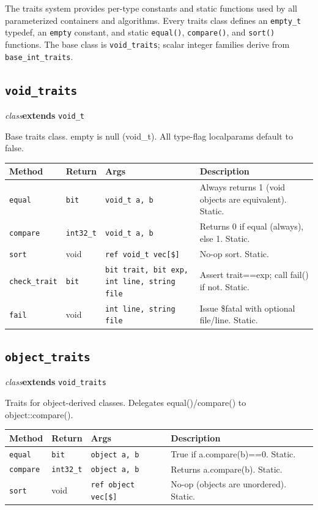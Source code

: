 \documentclass[11pt,letterpaper]{report}
\begin{document}
The traits system provides per-type constants and static functions used by all parameterized containers and algorithms. Every traits class defines an \texttt{empty\_t} typedef, an \texttt{empty} constant, and static \texttt{equal()}, \texttt{compare()}, and \texttt{sort()} functions. The base class is \texttt{void\_traits}; scalar integer families derive from \texttt{base\_int\_traits}.

\subsection*{\texttt{void\_traits}}
\noindent\small\textit{class}\quad \textbf{extends} \texttt{void\_t}\par

Base traits class. empty is null (void\_t). All type-flag localparams default to false.

\begin{xltabular}{\linewidth}{>{\small}p{1.35in} >{\small}p{1.25in} >{\small}p{0.95in} >{\small}X}
\toprule
\textbf{Method} & \textbf{Return} & \textbf{Args} & \textbf{Description} \\
\midrule
\endhead
\bottomrule
\endfoot
\texttt{equal} & \texttt{bit} & \texttt{void\_t a, b} & Always returns 1 (void objects are equivalent). Static. \\
\texttt{compare} & \texttt{int32\_t} & \texttt{void\_t a, b} & Returns 0 if equal (always), else 1. Static. \\
\texttt{sort} & void & \texttt{ref void\_t vec[\$]} & No-op sort. Static. \\
\texttt{check\_trait} & \texttt{bit} & \texttt{bit trait, bit exp, int line, string file} & Assert trait==exp; call fail() if not. Static. \\
\texttt{fail} & void & \texttt{int line, string file} & Issue \$fatal with optional file/line. Static. \\
\end{xltabular}

\subsection*{\texttt{object\_traits}}
\noindent\small\textit{class}\quad \textbf{extends} \texttt{void\_traits}\par

Traits for object-derived classes. Delegates equal()/compare() to object::compare().

\begin{xltabular}{\linewidth}{>{\small}p{1.35in} >{\small}p{1.25in} >{\small}p{0.95in} >{\small}X}
\toprule
\textbf{Method} & \textbf{Return} & \textbf{Args} & \textbf{Description} \\
\midrule
\endhead
\bottomrule
\endfoot
\texttt{equal} & \texttt{bit} & \texttt{object a, b} & True if a.compare(b)==0. Static. \\
\texttt{compare} & \texttt{int32\_t} & \texttt{object a, b} & Returns a.compare(b). Static. \\
\texttt{sort} & void & \texttt{ref object vec[\$]} & No-op (objects are unordered). Static. \\
\end{xltabular}
\end{document}
